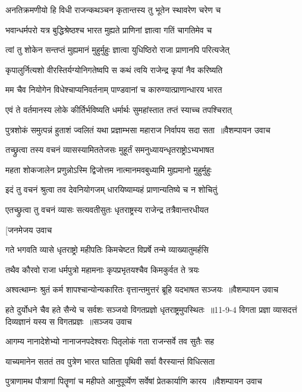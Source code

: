 \twolineshloka
{अनतिक्रमणीयो हि विधी राजन्कथञ्चन}
{कृतान्तस्य तु भूतेन स्थावरेण चरेण च}


\twolineshloka
{भवान्धर्मपरो यत्र बुद्धिश्रेष्ठश्च भारत}
{मुह्यते प्राणिनां ज्ञात्वा गतिं चागतिमेव च}


\twolineshloka
{त्वां तु शोकेन सन्तप्तं मुह्यमानं मुहुर्मुहुः}
{ज्ञात्वा युधिष्ठिरो राजा प्राणानपि परित्यजेत्}


\twolineshloka
{कृपालुर्नित्यशो वीरस्तिर्यग्योनिगतेष्वपि}
{स कथं त्वयि राजेन्द्र कृपां नैव करिष्यति}


\twolineshloka
{मम चैव नियोगेन विधेश्चाप्यनिवर्तनाम्}
{पाण्डवानां च कारुण्यात्प्राणान्धारय भारत}


\twolineshloka
{एवं ते वर्तमानस्य लोके कीर्तिर्भविष्यति}
{धर्मार्थः सुमहांस्तात तप्तं स्याच्च तपश्चिरात्}


\threelineshloka
{पुत्रशोकं समुत्पन्नं हुताशं ज्वलितं यथा}
{प्रज्ञाम्भसा महाराज निर्वापय सदा सता ॥वैशम्पायन उवाच}
{}


\twolineshloka
{तच्छ्रुत्वा तस्य वचनं व्यासस्यामिततेजसः}
{मुहूर्तं समनुध्यायन्धृतराष्ट्रोऽभ्यभाषत}


\twolineshloka
{महता शोकजालेन प्रणुन्नोऽस्मि द्विजोत्तम}
{नात्मानमवबुध्यामि मुह्यमानो मुहुर्मुहुः}


\twolineshloka
{इदं तु वचनं श्रुत्वा तव देवनियोगजम्}
{धारयिष्याम्यहं प्राणान्यतिष्ये च न शोचितुं}


\twolineshloka
{एतच्छ्रुत्वा तु वचनं व्यासः सत्यवतीसुतः}
{धृतराष्ट्रस्य राजेन्द्र तत्रैवान्तरधीयत}


\twolineshloka
{[जनमेजय उवाच}
{}


\twolineshloka
{गते भगवति व्यासे धृतराष्ट्रो महीपतिः}
{किमचेष्टत विप्रर्षे तन्मे व्याख्यातुमर्हसि}


\twolineshloka
{तथैव कौरवो राजा धर्मपुत्रो महामनाः}
{कृपप्रभृतयश्चैव किमकुर्वत ते त्रयः}


\threelineshloka
{अश्वत्थाम्नः श्रुतं कर्म शापश्चान्योन्यकारितः}
{वृत्तान्तमुत्तरं ब्रूहि यदभाषत सञ्जयः ॥वैशम्पायन उवाच}
{}


\threelineshloka
{हते दुर्योधने चैव हते सैन्ये च सर्वशः}
{सञ्जयो विगतप्रज्ञो धृतराष्ट्रमुपस्थितः ॥11-9-4 विगता प्रज्ञा व्यासदत्तं दिव्यज्ञानं यस्य स विगतप्रज्ञः ॥सञ्जय उवाच}
{}


\twolineshloka
{आगम्य नानादेशेभ्यो नानाजनपदेश्वराः}
{पितृलोकं गता राजन्सर्वे तव सुतैः सह}


\twolineshloka
{याच्यमानेन सततं तव पुत्रेण भारत}
{घातिता पृथिवी सर्वा वैरस्यान्तं विधित्सता}


\threelineshloka
{पुत्राणामथ पौत्राणां पितॄणां च महीपते}
{आनुपूर्व्येण सर्वेषां प्रेतकार्याणि कारय ॥वैशम्पायन उवाच}
{}



